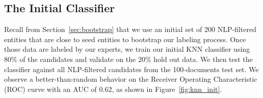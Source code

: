 \subsection{The Initial Classifier}
Recall from Section~\ref{sec:bootstrap} that we use an initial set of 200 NLP-filtered entities that are close
to seed entities to bootstrap our labeling process.
Once those data are labeled by our experts, we train our initial KNN classifier using 80\% of the candidates and validate on the 20\% hold out data. 
We then test the classifier against all NLP-filtered candidates from the 100-documents test set.
We observe a better-than-random behavior on the Receiver Operating Characteristic (ROC) curve with an AUC of 0.62, as shown in 
Figure~\ref{fig:knn_init}. %
